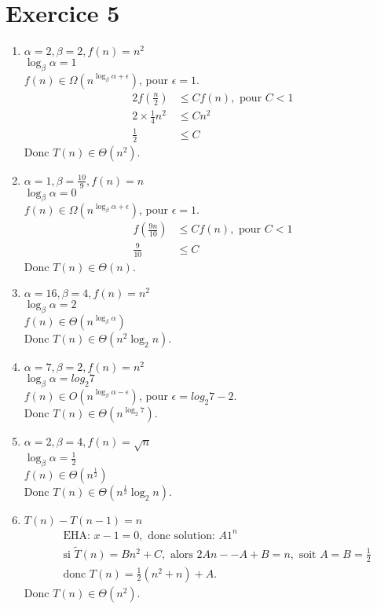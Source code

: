 \documentclass[fontsize=10pt]{article}
\begin{document}
\section*{Exercice 5}
\begin{enumerate}
\item $\alpha = 2, \beta = 2, f(n) = n^2$\\
$\log_\beta{\alpha} = 1$\\
$f(n) \in{\Omega}(n^{\log_{\beta}{\alpha} + \epsilon})$, pour $\epsilon = 1$.\\
\begin{align*}
2f(\frac{n}{2}) &\leq Cf(n),\text{ pour }C < 1\\
2 \times \frac{1}{4} n^2 &\leq Cn^2\\
\frac{1}{2} &\leq C
\end{align*}
Donc $T(n) \in{\Theta}(n^2)$.

\item $\alpha = 1, \beta = \frac{10}{9}, f(n) = n$\\
$\log_\beta{\alpha} = 0$\\
$f(n) \in{\Omega}(n^{\log_{\beta}{\alpha} + \epsilon})$, pour $\epsilon = 1$.\\
\begin{align*}
f(\frac{9n}{10}) &\leq Cf(n),\text{ pour }C < 1\\
\frac{9}{10} &\leq C
\end{align*}
Donc $T(n) \in{\Theta}(n)$.

\item $\alpha = 16, \beta = 4, f(n) = n^2$\\
$\log_\beta{\alpha} = 2$\\
$f(n) \in{\Theta}(n^{\log_{\beta}{\alpha}})$\\
Donc $T(n) \in{\Theta}(n^2\log_2{n})$.

\item $\alpha = 7, \beta = 2, f(n) = n^2$\\
$\log_\beta{\alpha} = log_2{7}$\\
$f(n) \in{O}(n^{\log_{\beta}{\alpha} - \epsilon})$, pour $\epsilon = log_2{7} - 2$.\\
Donc $T(n) \in{\Theta}(n^{\log_2{7}})$.

\item $\alpha = 2, \beta = 4, f(n) = \sqrt{n}$\\
$\log_\beta{\alpha} = \frac{1}{2}$\\
$f(n) \in{\Theta}(n^{\frac{1}{2}})$\\
Donc $T(n) \in{\Theta}(n^{\frac{1}{2}}\log_2{n})$.

\item $T(n) - T(n-1) = n$
\begin{align*}
& \text{EHA: } x - 1 = 0, \text{ donc solution: } A1^n\\
& \text{si } \tilde{T}(n) = Bn^2 + C, \text{ alors } 2An -- A  + B = n, \text{ soit } A = B = \frac{1}{2}\\
& \text{donc } T(n) = \frac{1}{2}(n^2 + n) + A.
\end{align*}
Donc $T(n) \in{\Theta}(n^2)$.
\end{enumerate}
\end{document}
